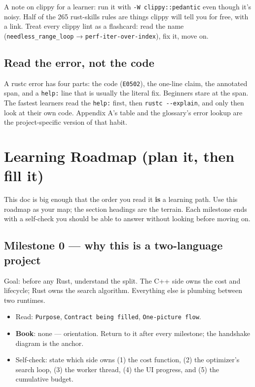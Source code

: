 \documentclass[11pt]{article}
\begin{document}
A note on clippy for a learner: run it with \texttt{-W clippy::pedantic} even though
it's noisy. Half of the 265 rust-skills rules are things clippy will tell you
for free, with a link. Treat every clippy lint as a flashcard: read the name
(\texttt{needless\_range\_loop} → \texttt{perf-iter-over-index}), fix it, move on.
\subsection{Read the error, not the code}
\label{sec:orgd2631f0}

A rustc error has four parts: the code (\texttt{E0502}), the one-line claim, the
annotated span, and a \texttt{help:} line that is usually the literal fix. Beginners
stare at the span. The fastest learners read the \texttt{help:} first, then
\texttt{rustc -{}-{}explain}, and only then look at their own code. Appendix A's table and
the glossary's error lookup are the project-specific version of that habit.
\section{Learning Roadmap (plan it, then fill it)}
\label{sec:orgf9a092b}

This doc is big enough that the order you read it \textbf{is} a learning path. Use
this roadmap as your map; the section headings are the terrain. Each milestone
ends with a self-check you should be able to answer without looking before
moving on.
\subsection{Milestone 0 — why this is a two-language project}
\label{sec:org751644c}

Goal: before any Rust, understand the split. The C++ side owns the cost and
lifecycle; Rust owns the search algorithm. Everything else is plumbing between
two runtimes.

\begin{itemize}
\item Read: \texttt{Purpose}, \texttt{Contract being filled}, \texttt{One-picture flow}.
\item \textbf{\textbf{Book}}: none — orientation. Return to it after every milestone; the
handshake diagram is the anchor.
\item Self-check: state which side owns (1) the cost function, (2) the optimizer's
search loop, (3) the worker thread, (4) the UI progress, and (5) the
cumulative budget.
\end{itemize}
\end{document}
